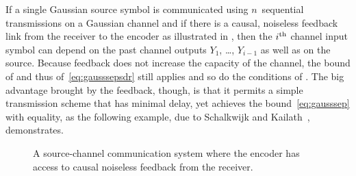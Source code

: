 If a single Gaussian source symbol is communicated using $n$~sequential
transmissions on a Gaussian channel and if there is a causal, noiseless feedback
link from the receiver to the encoder as illustrated in ,
then the $i{^{\text{th}}}$ channel input symbol can depend on the past channel outputs
$Y_1$, \dots, $Y_{i-1}$ as well as on the source. Because feedback does not
increase the capacity of the channel, the bound of 
and thus of~\eqref{eq:gausssepsdr} still applies and so do the conditions of
. The big advantage brought by the feedback,
though, is that it permits a simple transmission scheme that has minimal delay,
yet achieves the bound~\eqref{eq:gausssep} with equality, as the following
example, due to Schalkwijk and Kailath~\cite{SchalkwijkK1966}, demonstrates.

\begin{figure}
  \begin{center}
    
  \end{center}
  \caption{A source-channel communication system where the encoder has access to
  causal noiseless feedback from the receiver.}
  \label{fig:scgenfeedback}
\end{figure}

